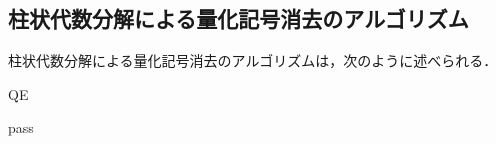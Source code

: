 \documentclass[uplatex, dvipdfmx]{jsarticle}
\numberwithin{equation}{section}
\theoremstyle{definition}
\begin{document}
\subsection{柱状代数分解による量化記号消去のアルゴリズム}

柱状代数分解による量化記号消去のアルゴリズムは，次のように述べられる．

\begin{algorithm}
     \caption{QE}
     \begin{algorithmic}[1]
     \REQUIRE 
     \ENSURE 
     \STATE pass
     \end{algorithmic}
\end{algorithm}





\end{document}

